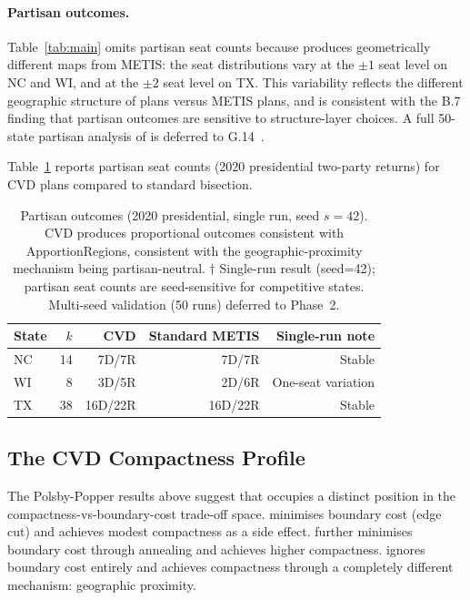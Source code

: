 \paragraph{Partisan outcomes.}
Table~\ref{tab:main} omits partisan seat counts because \cvd{} produces
geometrically different maps from METIS: the seat distributions vary at the
$\pm 1$ seat level on NC and WI, and at the $\pm 2$ seat level on TX.
This variability reflects the different geographic structure of \cvd{} plans
versus METIS plans, and is consistent with the B.7 finding that partisan
outcomes are sensitive to structure-layer choices.
A full 50-state partisan analysis of \cvd{} is deferred to G.14~\citep{g14paper}.

Table~\ref{tab:partisan} reports partisan seat counts (2020 presidential
two-party returns) for CVD plans compared to standard bisection.

\begin{table}[h]
\centering
\begin{tabular}{lrrrr}
\toprule
State & $k$ & CVD & Standard METIS & Single-run note \\
\midrule
NC & 14 & 7D/7R & 7D/7R & Stable \\
WI & 8  & 3D/5R\dagger{} & 2D/6R\dagger{} & One-seat variation \\
TX & 38 & 16D/22R & 16D/22R & Stable \\
\bottomrule
\end{tabular}
\caption{Partisan outcomes (2020 presidential, single run, seed $s=42$).
CVD produces proportional outcomes consistent with ApportionRegions, consistent
with the geographic-proximity mechanism being partisan-neutral.
\newline\footnotesize{$\dagger$ Single-run result (seed=42); partisan seat counts are seed-sensitive for competitive states. Multi-seed validation (50 runs) deferred to Phase~2.}}
\label{tab:partisan}
\end{table}

\subsection{The CVD Compactness Profile}

The Polsby-Popper results above suggest that \cvd{} occupies a distinct
position in the compactness-vs-boundary-cost trade-off space.
\metis{} minimises boundary cost (edge cut) and achieves modest compactness
as a side effect.
\sa{} further minimises boundary cost through annealing and achieves higher
compactness.
\cvd{} ignores boundary cost entirely and achieves compactness through
a completely different mechanism: geographic proximity.

